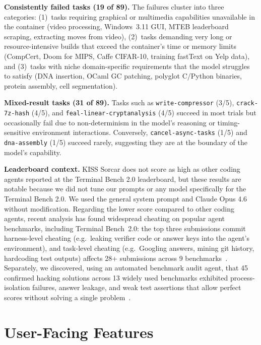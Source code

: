\documentclass{article}
\begin{document}
\textbf{Consistently failed tasks (19 of 89).} The failures cluster into three categories: (1)~tasks requiring graphical or multimedia capabilities unavailable in the container (video processing, Windows~3.11 GUI, MTEB leaderboard scraping, extracting moves from video), (2)~tasks demanding very long or resource-intensive builds that exceed the container's time or memory limits (CompCert, Doom for MIPS, Caffe CIFAR-10, training fastText on Yelp data), and (3)~tasks with niche domain-specific requirements that the model struggles to satisfy (DNA insertion, OCaml GC patching, polyglot C/Python binaries, protein assembly, cell segmentation).

\textbf{Mixed-result tasks (31 of 89).} Tasks such as \texttt{write-compressor} (3/5), \texttt{crack-7z-hash} (4/5), and \texttt{feal-linear-cryptanalysis} (4/5) succeed in most trials but occasionally fail due to non-determinism in the model's reasoning or timing-sensitive environment interactions.  Conversely, \texttt{cancel-async-tasks} (1/5) and \texttt{dna-assembly} (1/5) succeed rarely, suggesting they are at the boundary of the model's capability.

\textbf{Leaderboard context.}  KISS Sorcar does not score as high as other coding agents reported at the Terminal Bench 2.0 leaderboard, but these results are notable because we did not tune our prompts or any model specifically for the Terminal Bench 2.0.  We used the general system prompt and Claude Opus 4.6 without modification.  Regarding the lower score compared to other coding agents, recent analysis has found widespread cheating on popular agent benchmarks, including Terminal Bench~2.0: the top three submissions commit harness-level cheating (e.g.\ leaking verifier code or answer keys into the agent's environment), and task-level cheating (e.g.\ Googling answers, mining git history, hardcoding test outputs) affects 28+ submissions across 9 benchmarks~\citep{stein2026cheatingblog,stein2026detecting}. Separately, we discovered, using an automated benchmark audit agent, that 45 confirmed hacking solutions across 13 widely used benchmarks exhibited process-isolation failures, answer leakage, and weak test assertions that allow perfect scores without solving a single problem~\citep{wang2026trustworthyblog}.

\section{User-Facing Features}
\label{sec:vscode-features}
\end{document}
